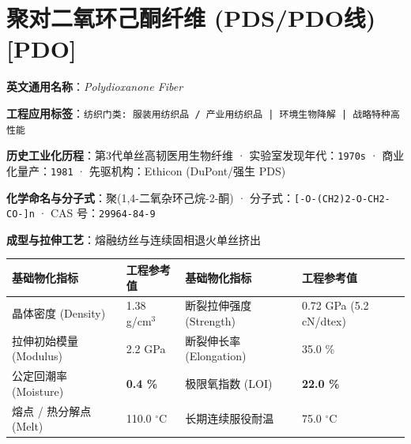 \documentclass[11pt,openright,twoside,UTF8]{ctexbook}
\begin{document}
\section{聚对二氧环己酮纤维 (PDS/PDO线) [PDO]}
\label{sec:pdo}

\noindent\textbf{英文通用名称}：\textit{Polydioxanone Fiber}\par
\noindent\textbf{工程应用标签}：\texttt{纺织门类: 服装用纺织品 / 产业用纺织品 | 环境生物降解 | 战略特种高性能}\par
\noindent\textbf{历史工业化历程}：第3代单丝高韧医用生物纤维 · 实验室发现年代：\texttt{1970s} · 商业化量产：\texttt{1981} · 先驱机构：Ethicon (DuPont/强生 PDS)\par
\noindent\textbf{化学命名与分子式}：聚(1,4-二氧杂环己烷-2-酮) · 分子式：\texttt{[-O-(CH2)2-O-CH2-CO-]n} · CAS 号：\texttt{29964-84-9}\par
\noindent\textbf{成型与拉伸工艺}：熔融纺丝与连续固相退火单丝挤出\par

\vspace{0.15cm}
\begin{center}
\small
\begin{tabularx}{\textwidth}{p{3.8cm}Xp{3.8cm}X}
\toprule
\textbf{基础物化指标} & \textbf{工程参考值} & \textbf{基础物化指标} & \textbf{工程参考值} \\
\midrule
晶体密度 (Density) & 1.38 g/cm$^3$ & 断裂拉伸强度 (Strength) & 0.72 GPa (5.2 cN/dtex) \\
拉伸初始模量 (Modulus) & 2.2 GPa & 断裂伸长率 (Elongation) & 35.0 \% \\
公定回潮率 (Moisture) & \textbf{0.4 \%} & 极限氧指数 (LOI) & \textbf{22.0 \%} \\
熔点 / 热分解点 (Melt) & 110.0 $^\circ\mathrm{C}$ & 长期连续服役耐温 & 75.0 $^\circ\mathrm{C}$ \\
\bottomrule
\end{tabularx}
\end{center}
\vspace{0.15cm}
\end{document}
